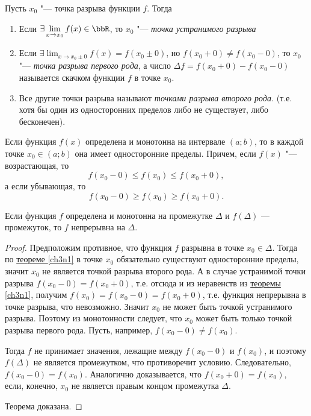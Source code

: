 \begin{defn}
Пусть $x_0$ "--- точка разрыва функции $f$. Тогда 
\begin{enumerate}[wide, labelwidth=!, labelindent=0pt]
\item

Если $\exists \lim_{x \to x_0}\limits f(x) \in \bbR$, то $x_0$ "--- \textit{точка устранимого разрыва}
\item
Если $\exists \lim_{x \to x_0\pm0}\limits f(x)=f(x_0\pm 0)$, но $f(x_0+0)\ne f(x_0-0)$, то $x_0$ "--- \textit{точка разрыва первого рода}, а число $\Delta f=f(x_0+0)-f(x_0-0)$ называется скачком функции $f$ в точке $x_0$.
\item
Все другие точки разрыва называют \textit{точками разрыва второго рода.} (т.е. хотя бы один из односторонних пределов либо не существует, либо бесконечен).
\end{enumerate}
\end{defn}
\begin{thm} \label{ch3n1} 
Если функция $f(x)$ определена и монотонна на интервале $(a;b)$, то в каждой точке $x_0\in(a;b)$ она имеет односторонние пределы. Причем, если $f(x)$ "--- возрастающая, то 
$$
f(x_0-0)\le f(x_0)\le f(x_0+0),
$$
а если убывающая, то
$$
f(x_0-0)\ge f(x_0)\ge f(x_0+0).
$$
\end{thm}
\begin{thm} \label{ch3n3} 
Если функция $f$ определена и монотонна на промежутке $\Delta$ и $f(\Delta)$ — промежуток, то $f$ непрерывна на $\Delta$.
\end{thm}
\begin{proof}
Предположим противное, что функция $f$ разрывна в точке $x_0 \in\Delta$. Тогда по \hyperref[ch3n1]{теореме \ref{ch3n1}} в точке $x_0$ обязательно существуют односторонние пределы, значит $x_0$ не является точкой разрыва второго рода.  А в случае устранимой точки разрыва $f(x_0-0)=f(x_0+0)$, т.е. отсюда и из неравенств из   \hyperref[ch3n1]{теоремы \ref{ch3n1}}, получим $f(x_0)=f(x_0-0)=f(x_0+0)$, т.е. функция непрерывна в точке разрыва, что невозможно. Значит $x_0$ не может быть точкой устранимого разрыва. Поэтому из монотонности следует, что $x_0$ может быть только точкой разрыва первого рода. Пусть, например, $f(x_0-0)\ne f(x_0)$.

Тогда $f$ не принимает значения, лежащие между $f(x_0 - 0)$ и $f(x_0)$, и поэтому $f(\Delta)$ не является промежутком, что противоречит условию. Следовательно, $f(x_0-0) = f(x_0)$. Аналогично доказывается, что  $f(x_0 + 0) = f(x_0)$, если, конечно, $x_0$ не является правым концом промежутка $\Delta$. 

Теорема доказана.
\end{proof} 

